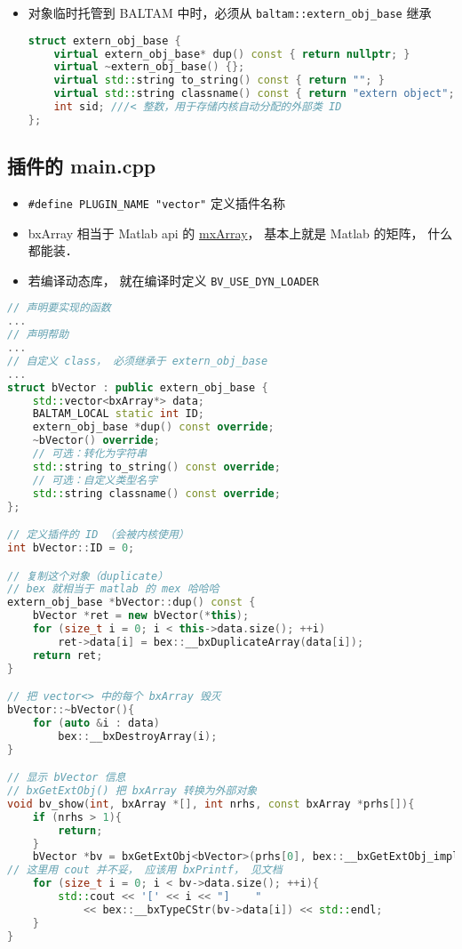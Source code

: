 
\begin{issues}
\issueDraft
\end{issues}

\begin{itemize}
\item 对象临时托管到 BALTAM 中时，必须从 \verb|baltam::extern_obj_base| 继承
\begin{lstlisting}[language=cpp, caption=extern\_obj.h节选]
struct extern_obj_base {
    virtual extern_obj_base* dup() const { return nullptr; }
    virtual ~extern_obj_base() {};
    virtual std::string to_string() const { return ""; }
    virtual std::string classname() const { return "extern object"; };
    int sid; ///< 整数，用于存储内核自动分配的外部类 ID
};
\end{lstlisting}
\end{itemize}

\subsection{插件的 main.cpp}
\begin{itemize}
\item \verb|#define PLUGIN_NAME "vector"| 定义插件名称
\item bxArray 相当于 Matlab api 的 \href{https://www.mathworks.com/help/matlab/apiref/mxarray.html}{mxArray}， 基本上就是 Matlab 的矩阵， 什么都能装．
\item 若编译动态库， 就在编译时定义 \verb|BV_USE_DYN_LOADER|
\end{itemize}

\begin{lstlisting}[language=cpp,caption=vector 插件的 main.cpp]
// 声明要实现的函数
...
// 声明帮助
...
// 自定义 class， 必须继承于 extern_obj_base
...
struct bVector : public extern_obj_base {
    std::vector<bxArray*> data;
    BALTAM_LOCAL static int ID;
    extern_obj_base *dup() const override;
    ~bVector() override;
    // 可选：转化为字符串
    std::string to_string() const override;
    // 可选：自定义类型名字
    std::string classname() const override;
};

// 定义插件的 ID （会被内核使用）
int bVector::ID = 0;

// 复制这个对象（duplicate）
// bex 就相当于 matlab 的 mex 哈哈哈
extern_obj_base *bVector::dup() const {
    bVector *ret = new bVector(*this);
    for (size_t i = 0; i < this->data.size(); ++i)
        ret->data[i] = bex::__bxDuplicateArray(data[i]);
    return ret;
}

// 把 vector<> 中的每个 bxArray 毁灭
bVector::~bVector(){
    for (auto &i : data)
        bex::__bxDestroyArray(i);
}

// 显示 bVector 信息
// bxGetExtObj() 把 bxArray 转换为外部对象
void bv_show(int, bxArray *[], int nrhs, const bxArray *prhs[]){
    if (nrhs > 1){
        return;
    }
    bVector *bv = bxGetExtObj<bVector>(prhs[0], bex::__bxGetExtObj_impl);
// 这里用 cout 并不妥， 应该用 bxPrintf， 见文档
    for (size_t i = 0; i < bv->data.size(); ++i){
        std::cout << '[' << i << "]    "
            << bex::__bxTypeCStr(bv->data[i]) << std::endl;
    }
}
\end{lstlisting}

